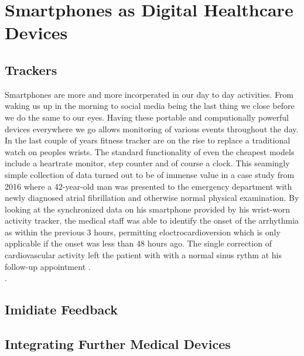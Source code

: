 \section{Smartphones as Digital Healthcare Devices}
\subsection{Trackers}
Smartphones are more and more incorperated in our day to day activities. From waking us up in the morning to social media being the last thing we close before we do the same to our eyes. Having these portable and computionally powerful devices everywhere we go allows monitoring of various events throughout the day. In the last couple of years fitness tracker are on the rise to replace a traditional watch on peoples wrists. The standard functionality of even the cheapest models include a heartrate monitor, step counter and of course a clock. This seamingly simple collection of data turned out to be of immense value in a case study from 2016 where a 42-year-old man was presented to the emergency department with newly diagnosed atrial fibrillation and otherwise normal physical examination. By looking at the synchronized data on his smartphone provided by his wrist-worn activity tracker, the medical staff was able to identify the onset of the arrhythmia as within the previous 3 hours, permitting eloctrocardioversion which is only applicable if the onset was less than 48 hours ago. The single correction of cardiovascular activity left the patient with with a normal sinus rythm at his follow-up appointment \cite{rudner2016interrogation}. \\.
\subsection{Imidiate Feedback}
\subsection{Integrating Further Medical Devices}

